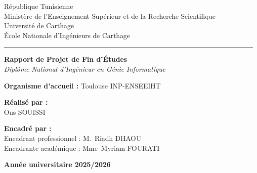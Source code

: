 \begin{titlepage}
\thispagestyle{empty}
\centering

\begin{minipage}[c]{0.32\textwidth}\centering
\end{minipage}\hfill
\begin{minipage}[c]{0.32\textwidth}\centering
\end{minipage}\hfill
\begin{minipage}[c]{0.32\textwidth}\centering
\end{minipage}

\vspace{0.8cm}

{\normalsize République Tunisienne}\\[0.15cm]
{\normalsize Ministère de l'Enseignement Supérieur et de la Recherche Scientifique}\\[0.15cm]
{\normalsize Université de Carthage}\\[0.15cm]
{\normalsize École Nationale d'Ingénieurs de Carthage}\\[0.4cm]

\rule{\textwidth}{0.6pt}

\vspace{1.4cm}

{\LARGE \bfseries Rapport de Projet de Fin d'Études}\\[0.8cm]
{\large \itshape Diplôme National d'Ingénieur en Génie Informatique}

\vspace{1.6cm}

{\setlength{\fboxsep}{12pt}%
 }

\vspace{1.2cm}

{\large \textbf{Organisme d'accueil :} Toulouse INP-ENSEEIHT}

\vfill

\begin{minipage}[t]{0.30\textwidth}
\begin{flushleft}
\textbf{Réalisé par :}\\[0.2cm]
Ons SOUISSI
\end{flushleft}
\end{minipage}\hfill
\begin{minipage}[t]{0.66\textwidth}
\begin{flushleft}
\textbf{Encadré par :}\\[0.2cm]
Encadrant professionnel : M.~Riadh DHAOU\\[0.15cm]
Encadrante académique : Mme~Myriam FOURATI
\end{flushleft}
\end{minipage}

\vfill

{\large \textbf{Année universitaire 2025/2026}}

\end{titlepage}
